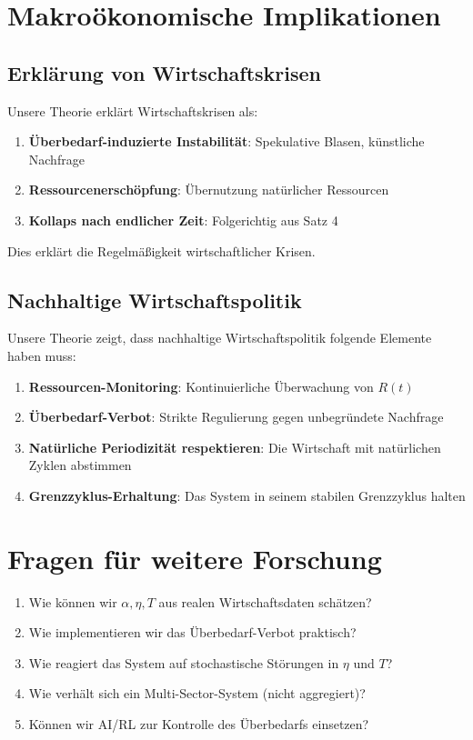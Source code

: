\documentclass[a4paper,11pt]{report}
\theoremstyle{definition}
\begin{document}
\section{Makroökonomische Implikationen}

\subsection{Erklärung von Wirtschaftskrisen}

Unsere Theorie erklärt Wirtschaftskrisen als:

\begin{enumerate}
    \item \textbf{Überbedarf-induzierte Instabilität}: Spekulative Blasen, künstliche Nachfrage
    \item \textbf{Ressourcenerschöpfung}: Übernutzung natürlicher Ressourcen
    \item \textbf{Kollaps nach endlicher Zeit}: Folgerichtig aus Satz 4
\end{enumerate}

Dies erklärt die Regelmäßigkeit wirtschaftlicher Krisen.

\subsection{Nachhaltige Wirtschaftspolitik}

Unsere Theorie zeigt, dass nachhaltige Wirtschaftspolitik folgende Elemente haben muss:

\begin{enumerate}
    \item \textbf{Ressourcen-Monitoring}: Kontinuierliche Überwachung von $R(t)$
    \item \textbf{Überbedarf-Verbot}: Strikte Regulierung gegen unbegründete Nachfrage
    \item \textbf{Natürliche Periodizität respektieren}: Die Wirtschaft mit natürlichen Zyklen abstimmen
    \item \textbf{Grenzzyklus-Erhaltung}: Das System in seinem stabilen Grenzzyklus halten
\end{enumerate}

\section{Fragen für weitere Forschung}

\begin{enumerate}
    \item Wie können wir $\alpha, \eta, T$ aus realen Wirtschaftsdaten schätzen?
    \item Wie implementieren wir das Überbedarf-Verbot praktisch?
    \item Wie reagiert das System auf stochastische Störungen in $\eta$ und $T$?
    \item Wie verhält sich ein Multi-Sector-System (nicht aggregiert)?
    \item Können wir AI/RL zur Kontrolle des Überbedarfs einsetzen?
\end{enumerate}
\end{document}
